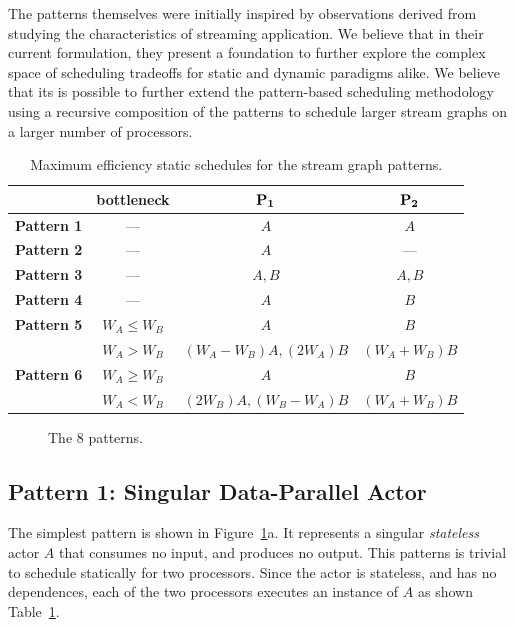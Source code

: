 The patterns themselves were initially inspired by observations
derived from studying the characteristics of streaming application. We
believe that in their current formulation, they present a foundation
to further explore the complex space of scheduling tradeoffs for
static and dynamic paradigms alike.  We believe that its is possible
to further extend the pattern-based scheduling methodology using a
recursive composition of the patterns to schedule larger stream graphs
on a larger number of processors.

\begin{table}[t]
\center
\caption{\small Maximum efficiency static schedules for the stream graph patterns.}
{\small
\begin{tabular}{|c|c|c|c|} \hline
                 & {\bf bottleneck} & ${\bf P_1}$  & ${\bf P_2}$ \\ \hline
{\bf Pattern 1}  & ---              & $A$     & $A$ \\ \hline
{\bf Pattern 2}  & ---              & $A$     & --- \\ \hline
{\bf Pattern 3}  & ---              & $A, B$  & $A, B$ \\ \hline
{\bf Pattern 4}  & ---              & $A$     & $B$ \\ \hline
{\bf Pattern 5}  & $W_A \le W_B$    & $A$     & $B$ \\ \cline{2-4}
                 & $W_A > W_B$      & $(W_A - W_B) A, (2W_A) B$ & $(W_A + W_B) B$ \\ \hline
{\bf Pattern 6}  & $W_A \ge W_B$    & $A$     & $B$ \\ \cline{2-4}
                 & $W_A < W_B$      & $(2W_B) A, (W_B - W_A) B$ & $(W_A + W_B) B$ \\ \hline
\end{tabular}}
\label{tab:pattern-sched}
\end{table}


\begin{figure}[t!]
\begin{center}
\caption{{\small The 8 patterns.
\protect\label{fig:patterns}}}
\end{center}
\end{figure}

\subsection{Pattern 1: Singular Data-Parallel Actor}

The simplest pattern is shown in Figure~\ref{fig:patterns}a. It
represents a singular {\it stateless} actor $A$ that consumes no
input, and produces no output.
This patterns is trivial to schedule statically for two
processors. Since the actor is stateless, and has no dependences, each
of the two processors executes an instance of $A$ as shown Table~\ref{tab:pattern-sched}.

